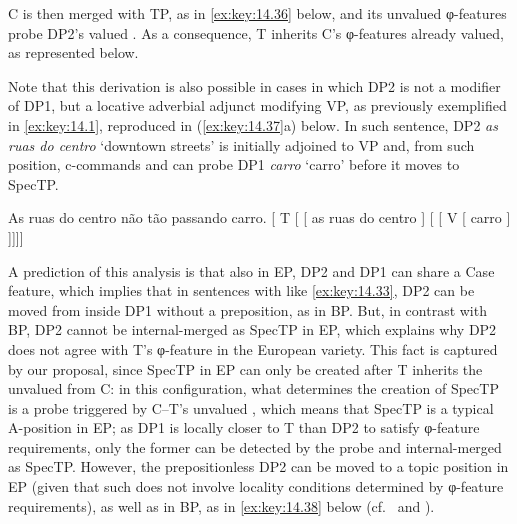 \documentclass[output=paper]{langsci/langscibook}
\begin{document}
C is then merged with TP, as in \eqref{ex:key:14.36} below, and its unvalued
φ-features probe DP2’s valued . As a consequence, T inherits C’s
φ-features already valued, as represented below.

\ea%
    \label{ex:key:14.36}
\z

Note that this derivation is also possible in cases in which DP2 is not a
modifier of DP1, but a locative adverbial adjunct modifying VP, as previously
exemplified in \eqref{ex:key:14.1}, reproduced in (\ref{ex:key:14.37}a) below. In such
sentence, DP2 \emph{as ruas do centro} ‘downtown streets’ is initially adjoined
to VP and, from such position, c-commands and can probe DP1 \emph{carro}
‘carro’ before it moves to SpecTP.\largerpage[1]

\ea%
    \label{ex:key:14.37}
	\ea     As ruas do centro não tão passando carro.
    \ex     {}[ T [ [ as ruas do centro ]
                [ [ V [ carro ] ]]]]
    \z
\z

A prediction of this analysis is that also in EP, DP2 and DP1 can share a Case
feature, which implies that in sentences with  like
\eqref{ex:key:14.33}, DP2 can be moved from inside DP1 without a preposition, as in
BP. But, in contrast with BP, DP2 cannot be internal-merged as SpecTP in EP,
which explains why DP2 does not agree with T’s φ-feature in the European
variety. This fact is captured by our proposal, since SpecTP in \gls{EP} can
only be created after T inherits the unvalued  from C\@: in this
configuration, what determines the creation of SpecTP is a probe triggered by
C--T’s unvalued , which means that SpecTP is a typical A-position in
\gls{EP}; as DP1 is locally closer to T than DP2 to satisfy φ-feature
requirements, only the former can be detected by the probe and internal-merged
as SpecTP\@.  However, the prepositionless DP2 can be moved to a topic position
in \gls{EP} (given that such  does not involve locality conditions
determined by φ-feature requirements), as well as in BP, as in \eqref{ex:key:14.38}
below (cf.\ \citealt{Costa2010} and \citealt{AvelarGalves2011}).
\end{document}
